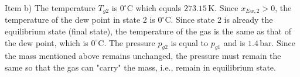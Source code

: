 Item b)
The temperature \( T_{g2} \) is \( 0^\circ \text{C} \) which equals \( 273.15 \, \text{K} \).
Since \( x_{Ew,2} > 0 \), the temperature of the dew point in state 2 is \( 0^\circ \text{C} \). Since state 2 is already the equilibrium state (final state), the temperature of the gas is the same as that of the dew point, which is \( 0^\circ \text{C} \).
The pressure \( p_{g2} \) is equal to \( p_{g1} \) and is \( 1.4 \, \text{bar} \).
Since the mass mentioned above remains unchanged, the pressure must remain the same so that the gas can "carry" the mass, i.e., remain in equilibrium state.